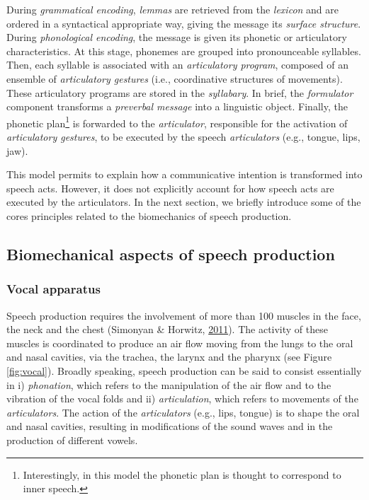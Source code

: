\documentclass[a4paper,12pt,twoside,openright,oldfontcommands]{memoir}
\let\rmarkdownfootnote\footnote%
\def\footnote{\protect\rmarkdownfootnote}
\begin{document}
During \emph{grammatical encoding}, \emph{lemmas} are retrieved from the \emph{lexicon} and are ordered in a syntactical appropriate way, giving the message its \emph{surface structure}. During \emph{phonological encoding}, the message is given its phonetic or articulatory characteristics. At this stage, phonemes are grouped into pronounceable syllables. Then, each syllable is associated with an \emph{articulatory program}, composed of an ensemble of \emph{articulatory gestures} (i.e., coordinative structures of movements). These articulatory programs are stored in the \emph{syllabary}. In brief, the \emph{formulator} component transforms a \emph{preverbal message} into a linguistic object. Finally, the phonetic plan\footnote{Interestingly, in this model the phonetic plan is thought to correspond to inner speech.} is forwarded to the \emph{articulator}, responsible for the activation of \emph{articulatory gestures}, to be executed by the speech \emph{articulators} (e.g., tongue, lips, jaw).

This model permits to explain how a communicative intention is transformed into speech acts. However, it does not explicitly account for how speech acts are executed by the articulators. In the next section, we briefly introduce some of the cores principles related to the biomechanics of speech production.

\hypertarget{biomechanical-aspects-of-speech-production}{%
\subsection{Biomechanical aspects of speech production}\label{biomechanical-aspects-of-speech-production}}

\hypertarget{vocal-apparatus}{%
\subsubsection{Vocal apparatus}\label{vocal-apparatus}}

Speech production requires the involvement of more than 100 muscles in the face, the neck and the chest (Simonyan \& Horwitz, \protect\hyperlink{ref-simonyan_laryngeal_2011}{2011}). The activity of these muscles is coordinated to produce an air flow moving from the lungs to the oral and nasal cavities, via the trachea, the larynx and the pharynx (see Figure \ref{fig:vocal}). Broadly speaking, speech production can be said to consist essentially in i) \emph{phonation}, which refers to the manipulation of the air flow and to the vibration of the vocal folds and ii) \emph{articulation}, which refers to movements of the \emph{articulators}. The action of the \emph{articulators} (e.g., lips, tongue) is to shape the oral and nasal cavities, resulting in modifications of the sound waves and in the production of different vowels.
\end{document}
